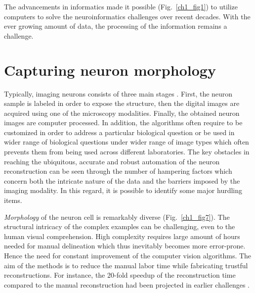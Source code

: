 The advancements in informatics made it possible (Fig.~\ref{ch1_fig1}) to utilize computers to solve the neuroinformatics challenges over recent decades. With the ever growing amount of data, the processing of the information remains a challenge.   

\section{Capturing neuron morphology}
Typically, imaging neurons consists of three main stages \cite{peng2015bigneuron}. First, the neuron sample is labeled in order to expose the structure, then the digital images are acquired using one of the microscopy modalities. Finally, the obtained neuron images are computer processed. In addition, the algorithms often require to be customized in order to address a particular biological question or be used in wider range of biological questions under wider range of image types which often prevents them from being used across different laboratories. The key obstacles in reaching the ubiquitous, accurate and robust automation of the neuron reconstruction \cite{meijering2010neuron,donohue2011automated,acciai2016automated} can be seen through the number of hampering factors which concern both the intricate nature of the data and the barriers imposed by the imaging modality. In this regard, it is possible to identify some major hurdling items.

\textit{Morphology} of the neuron cell is remarkably diverse (Fig.~\ref{ch1_fig7}). The structural intricacy of the complex examples can be challenging, even to the human visual comprehension. High complexity requires large amount of hours needed for manual delineation which thus inevitably becomes more error-prone. Hence the need for constant improvement of the computer vision algorithms. The aim of the methods is to reduce the manual labor time while fabricating trustful reconstructions. For instance, the 20-fold speedup of the reconstruction time compared to the manual reconstruction had been projected in earlier challenges \cite{liu2011diadem}.

